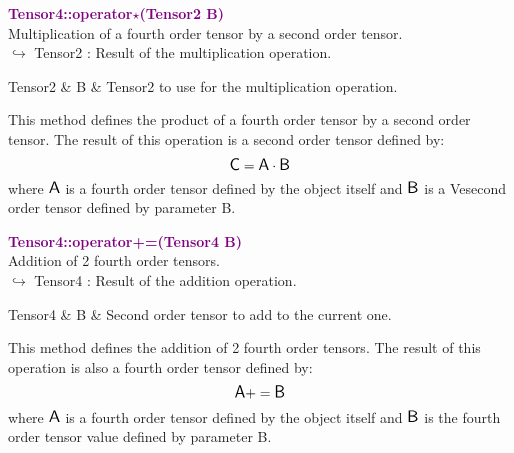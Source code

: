 \textcolor{purple}{\textbf{Tensor4::operator$\star$(Tensor2 B)}}\label{Tensor4::operator*(Tensor2 B)}\\
Multiplication of a fourth order tensor by a second order tensor.\\ \hspace*{10mm}$\hookrightarrow$ Tensor2 : Result of the multiplication operation.

\begin{tcolorbox}[width=\textwidth,myArgs,tabularx={ll|R}]
Tensor2 & B & Tensor2 to use for the multiplication operation.
\end{tcolorbox}

This method defines the product of a fourth order tensor by a second order tensor.
The result of this operation is a second order tensor defined by:
\begin{equation*}
\mbox{\large\ensuremath{\mathsf{C}}} = \mbox{\large\ensuremath{\mathsf{A}}} \cdot \mbox{\large\ensuremath{\mathsf{B}}}
\end{equation*}
where $\mbox{\large\ensuremath{\mathsf{A}}}$ is a fourth order tensor defined by the object itself and $\mbox{\large\ensuremath{\mathsf{B}}}$ is a Vesecond order tensor defined by parameter B.

\textcolor{purple}{\textbf{Tensor4::operator+=(Tensor4 B)}}\label{Tensor4::operator+=(Tensor4 B)}\\
Addition of 2 fourth order tensors.\\ \hspace*{10mm}$\hookrightarrow$ Tensor4 : Result of the addition operation.

\begin{tcolorbox}[width=\textwidth,myArgs,tabularx={ll|R}]
Tensor4 & B & Second order tensor to add to the current one.
\end{tcolorbox}

This method defines the addition of 2 fourth order tensors.
The result of this operation is also a fourth order tensor defined by:
\begin{equation*}
\mbox{\large\ensuremath{\mathsf{A}}} += \mbox{\large\ensuremath{\mathsf{B}}}
\end{equation*}
where $\mbox{\large\ensuremath{\mathsf{A}}}$ is a fourth order tensor defined by the object itself and $\mbox{\large\ensuremath{\mathsf{B}}}$ is the fourth order tensor value defined by parameter B.

